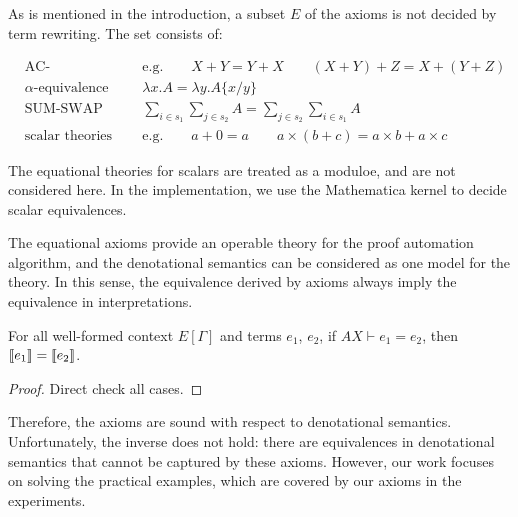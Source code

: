 \documentclass[runningheads]{llncs}
\begin{document}
As is mentioned in the introduction, a subset $E$ of the axioms is not decided by term rewriting. The set consists of:

\begin{align*}
    & \textrm{AC-equivalence} 
    && \textrm{e.g.} \qquad X + Y = Y + X \qquad (X + Y) + Z = X + (Y + Z) \\
    & \textrm{$\alpha$-equivalence}
    && \lambda x . A = \lambda y . A\{x/y\} \\
    & \textrm{SUM-SWAP}
    && \sum_{i \in s_1} \sum_{j \in s_2} A = \sum_{j \in s_2} \sum_{i \in s_1} A \\
    & \textrm{scalar theories} 
    && \textrm{e.g.} \qquad a + 0 = a \qquad a \times (b + c) = a \times b + a \times c
\end{align*}

The equational theories for scalars are treated as a moduloe, and are not considered here. In the implementation, we use the Mathematica kernel to decide scalar equivalences.

The equational axioms provide an operable theory for the proof automation algorithm,
and the denotational semantics can be considered as one model for the theory.
In this sense, the equivalence derived by axioms always imply the equivalence in interpretations.

\begin{lemma}
    For all well-formed context $E[\Gamma]$ and terms $e_1$, $e_2$, if $AX \vdash e_1 = e_2$, then ${\llbracket e_1 \rrbracket} = {\llbracket e_2 \rrbracket}$.
\end{lemma}
\begin{proof}
    Direct check all cases.
\end{proof}

Therefore, the axioms are sound with respect to denotational semantics. 
Unfortunately, the inverse does not hold: there are equivalences in denotational semantics that cannot be captured by these axioms. 
However, our work focuses on solving the practical examples, which are covered by our axioms in the experiments.
\end{document}
